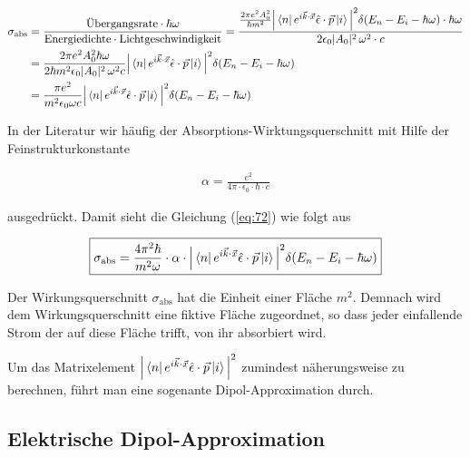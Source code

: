 \begin{align}
  \label{eq:72}
  \sigma_{\text{abs}} &= \frac{\text{Übergangsrate} \cdot\hbar\omega}{\text{Energiedichte}\cdot\text{Lichtgeschwindigkeit} } = \frac{ \frac{2\pi e^2 A_0^2}{\hbar m^2}\Big| \left\langle n \right| e^{i\vec k\cdot \vec x} \hat\epsilon \cdot \vec p \left| i \right\rangle \Big|^2 \delta(E_n - E_i - \hbar\omega) \cdot\hbar\omega }{ 2 \epsilon_0 |A_0|^2\, \omega^2 \cdot c} \notag\\
&= \frac{2\pi e^2 A_0^2 \hbar\omega }{2 \hbar m^2 \epsilon_0 |A_0|^2\, \omega^2 c}\Big| \left\langle n \right| e^{i\vec k\cdot \vec x} \hat\epsilon \cdot \vec p \left| i \right\rangle \Big|^2 \delta(E_n - E_i - \hbar\omega)  \notag\\
&= \frac{\pi e^2 }{ m^2 \epsilon_0 \omega c}\Big| \left\langle n \right| e^{i\vec k\cdot \vec x} \hat\epsilon \cdot \vec p \left| i \right\rangle \Big|^2 \delta(E_n - E_i - \hbar\omega)  \notag\\
\end{align}

In der Literatur wir häufig der Absorptions-Wirktungsquerschnitt mit Hilfe der Feinstrukturkonstante

\begin{align}
  \label{eq:73}
  \alpha = \frac{e^2}{4\pi\cdot\epsilon_0\cdot\hbar\cdot c}
\end{align}

ausgedrückt. Damit sieht die Gleichung (\ref{eq:72}) wie folgt aus

\begin{align}
  \label{eq:74}
  \boxed{\sigma_{\text{abs}} = \frac{4 \pi^2 \hbar }{ m^2 \omega} \cdot \alpha \cdot \Big| \left\langle n \right| e^{i\vec k\cdot \vec x} \hat\epsilon \cdot \vec p \left| i \right\rangle \Big|^2 \delta(E_n - E_i - \hbar\omega)}
\end{align}

Der Wirkungsquerschnitt \(\sigma_{\text{abs}}\) hat die Einheit einer Fläche \(m^2\). Demnach wird dem Wirkungsquerschnitt eine fiktive Fläche zugeordnet, so dass jeder einfallende Strom der auf diese Fläche trifft, von ihr absorbiert wird.

Um das Matrixelement \(\Big| \left\langle n \right| e^{i\vec k\cdot \vec x} \hat\epsilon \cdot \vec p \left| i \right\rangle \Big|^2 \) zumindest näherungsweise zu berechnen, führt man eine sogenante Dipol-Approximation durch.

\subsection*{Elektrische Dipol-Approximation}

